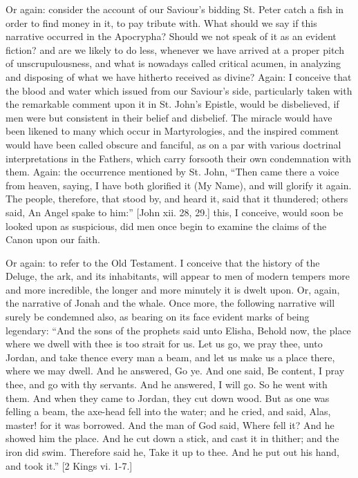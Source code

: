 Or again: consider the account of our Saviour's bidding St. Peter
catch a fish in order to find money in it, to pay tribute with. What
should we say if this narrative occurred in the Apocrypha? Should we
not speak of it as an evident fiction? and are we likely to do less,
whenever we have arrived at a proper pitch of unscrupulousness, and
what is nowadays called critical acumen, in analyzing and disposing of
what we have hitherto received as divine? Again: I conceive that the
blood and water which issued from our Saviour's side,
particularly taken with the remarkable comment upon it in St. John's
Epistle, would be disbelieved, if men were but consistent in their
belief and disbelief. The miracle would have been likened to many
which occur in Martyrologies, and the inspired comment would have been
called obscure and fanciful, as on a par with various doctrinal
interpretations in the Fathers, which carry forsooth their own
condemnation with them. Again: the occurrence mentioned by St. John,
``Then came there a voice from heaven, saying, I have both
glorified it (My Name), and will glorify it again. The people,
therefore, that stood by, and heard it, said that it thundered; others
said, An Angel spake to him:'' [John xii. 28, 29.] this, I
conceive, would soon be looked upon as suspicious, did men once begin
to examine the claims of the Canon upon our faith.

Or again: to refer to the Old Testament. I conceive that the
history of the Deluge, the ark, and its inhabitants, will appear to
men of modern tempers more and more incredible, the longer and more
minutely it is dwelt upon. Or, again, the narrative of Jonah and the
whale. Once more, the following narrative will surely be condemned
also, as bearing on its face evident marks of being legendary:
``And the sons of the prophets said unto Elisha, Behold now, the
place where we dwell with thee is too strait for us. Let us go, we
pray thee, unto Jordan, and take thence every man a beam, and let us
make us a place there, where we may dwell. And he answered, Go ye. And
one said, Be content, I pray thee, and go with thy servants. And he
answered, I will go. So he went with them. And when they came to
Jordan, they cut down wood. But as one was felling a beam, the
axe-head fell into the water; and he cried, and said, Alas,
master! for it was borrowed. And the man of God said, Where fell it?
And he showed him the place. And he cut down a stick, and cast it in
thither; and the iron did swim. Therefore said he, Take it up to thee.
And he put out his hand, and took it.'' [2 Kings vi. 1-7.]

